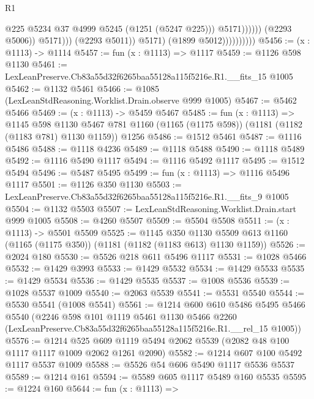 \begin{lexlean}{R1}
\begin{coremodule}
                                                @225
                                                @5234
                                                @37
                                                @4999
                                                @5245
                                                (@1251 (@5247 @225)))
                                              @5171))))))
                                  (@2293 @5006))
                                @5171)))
                          (@2293 @5011))
                        @5171)
                      (@1899 @5012))))))))))
@5456 := (x : @1113) -> @1114
@5457 := fun (x : @1113) => @1117
@5459 := @1126 @598 @1130
@5461 := LexLeanPreserve.Cb83a55d32f6265baa55128a115f5216e.R1.__fits_15 @1005
@5462 := @1132 @5461
@5466 := @1085 (LexLeanStdReasoning.Worklist.Drain.observe @999 @1005)
@5467 := @5462 @5466
@5469 := (x : @1113) -> @5459 @5467
@5485 := fun (x : @1113) =>
  @1145
    @598
    @1130
    @5467
    @781
    @1160
    (@1165 (@1175 @598))
    (@1181 (@1182 (@1183 @781) @1130 @1159))
    @1256
@5486 := @1512 @5461
@5487 := @1116 @5486
@5488 := @1118 @4236
@5489 := @1118 @5488
@5490 := @1118 @5489
@5492 := @1116 @5490 @1117
@5494 := @1116 @5492 @1117
@5495 := @1512 @5494
@5496 := @5487 @5495
@5499 := fun (x : @1113) => @1116 @5496 @1117
@5501 := @1126 @350 @1130
@5503 := LexLeanPreserve.Cb83a55d32f6265baa55128a115f5216e.R1.__fits_9 @1005
@5504 := @1132 @5503
@5507 := LexLeanStdReasoning.Worklist.Drain.start @999 @1005
@5508 := @4260 @5507
@5509 := @5504 @5508
@5511 := (x : @1113) -> @5501 @5509
@5525 := @1145
    @350
    @1130
    @5509
    @613
    @1160
    (@1165 (@1175 @350))
    (@1181 (@1182 (@1183 @613) @1130 @1159))
@5526 := @2024 @180
@5530 := @5526 @218 @611 @5496 @1117
@5531 := @1028 @5466
@5532 := @1429 @3993
@5533 := @1429 @5532
@5534 := @1429 @5533
@5535 := @1429 @5534
@5536 := @1429 @5535
@5537 := @1008 @5536
@5539 := @1028 @5537 @1009
@5540 := @2063 @5539
@5541 := @5531 @5540
@5544 := @5530 @5541 (@1008 @5541)
@5561 := @1214
    @600
    @610
    @5486
    @5495
    @5466
    @5540
    (@2246
      @598
      @101
      @1119
      @5461
      @1130
      @5466
      @2260
      (LexLeanPreserve.Cb83a55d32f6265baa55128a115f5216e.R1.__rel_15 @1005))
@5576 := @1214
    @525
    @609
    @1119
    @5494
    @2062
    @5539
    (@2082 @48 @100 @1117 @1117 @1009 @2062 @1261 @2090)
@5582 := @1214 @607 @100 @5492 @1117 @5537 @1009
@5588 := @5526 @54 @606 @5490 @1117 @5536 @5537
@5589 := @1214 @161
@5594 := @5589 @605 @1117 @5489 @160 @5535
@5595 := @1224 @160
@5644 := fun (x : @1113) =>

\end{coremodule}
\end{lexlean}

